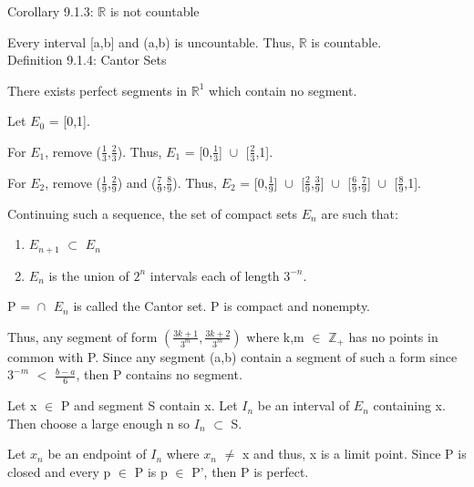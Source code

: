 { \color{orange} Corollary 9.1.3: $\mathbb{R}$ is not countable } 

	\begin{adjustbox}{minipage=14cm, right, vspace=0.1cm 0cm}
		Every interval [a,b] and (a,b) is uncountable.
		Thus, $\mathbb{R}$ is countable. \\
	\end{adjustbox}

{ \color{blue} Definition 9.1.4: Cantor Sets } 

	\begin{adjustbox}{minipage=14cm, right, vspace=0.1cm 0cm}
		There exists perfect segments in $\mathbb{R}^1$ which contain no segment.

		Let $E_0$ = [0,1].

		For $E_1$, remove ($\frac{1}{3}$,$\frac{2}{3}$).
		Thus, $E_1$ = [0,$\frac{1}{3}$] $\cup_{}^{}$ [$\frac{2}{3}$,1].

		For $E_2$, remove ($\frac{1}{9}$,$\frac{2}{9}$) and ($\frac{7}{9}$,$\frac{8}{9}$).
		Thus, $E_2$ = [0,$\frac{1}{9}$] $\cup_{}^{}$ [$\frac{2}{9}$,$\frac{3}{9}$] $\cup_{}^{}$
		[$\frac{6}{9}$,$\frac{7}{9}$] $\cup_{}^{}$ [$\frac{8}{9}$,1].

		Continuing such a sequence, the set of compact sets $E_n$ are such that:

		\begin{enumerate}[label=(\alph*), leftmargin=2cm, itemsep=0.1cm]
			\item $E_{n+1}$ $\subset$ $E_n$
			\item $E_n$ is the union of $2^n$ intervals each of length $3^{-n}$.
		\end{enumerate}

		P = $\cap_{}^{}$ $E_n$ is called the Cantor set.
		P is compact and nonempty.

		Thus, any segment of form $(\frac{3k+1}{3^m},\frac{3k+2}{3^m})$
		where k,m $\in$ $\mathbb{Z}_+$ has no points in common with P.
		Since any segment (a,b) contain a segment of such a form since
		$3^{-m}$ $<$ $\frac{b-a}{6}$, then P contains no segment.

		Let x $\in$ P and segment S contain x. Let $I_n$ be an interval of
		$E_n$ containing x. Then choose a large enough n so $I_n$ $\subset$ S.
		
		Let $x_n$ be an endpoint of $I_n$ where $x_n$ $\not =$ x and thus,
		x is a limit point. Since P is closed and every p $\in$ P is p $\in$ P',
		then P is perfect.
	\end{adjustbox}






